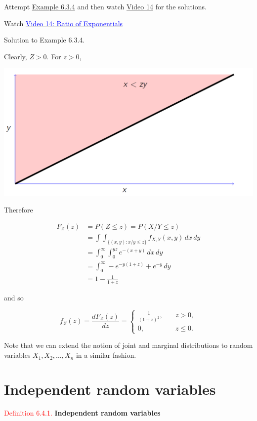 \documentclass[
]{book}
\begin{document}
Attempt \protect\hyperlink{jointdis:exer:joint_Z_Exp}{Example 6.3.4} and then watch \protect\hyperlink{video14}{Video 14} for the solutions.

Watch \href{https://mediaspace.nottingham.ac.uk/media/Ratio+of+Exponentials+FINAL+VERSION/1_iuf9blt3}{\textcolor{blue}{Video 14: Ratio of Exponentials}}

Solution to Example 6.3.4.

Clearly, \(Z>0\). For \(z>0\),

\includegraphics[width=0.7\linewidth]{Images/ratio_exp}

Therefore

\begin{align*}
F_Z(z) &= P( Z \leq z) = P(X/Y \leq z)\\
&= \int\int_{\{(x,y):x/y \leq z\}} f_{X,Y}(x,y) \,dx \,dy \\
&= \int_0^\infty \int_0^{yz} e^{-(x+y)} \,dx\,dy \\
&= \int_0^\infty -e^{-y(1+z)} + e^{-y} \,dy \\
&= 1-\frac{1}{1+z}
\end{align*}

and so

\[ f_Z(z) = \frac{dF_Z(z)}{dz} =\begin{cases} \frac{1}{(1+z)^2}, \quad &z>0, \\
0, \quad  &z \leq 0. \end{cases} \]

\hfill\break

Note that we can extend the notion of joint and marginal distributions to random variables \(X_1,X_2,\dots,X_n\) in a similar fashion.

\hypertarget{jointdis:independent}{%
\section{Independent random variables}\label{jointdis:independent}}

\leavevmode{}%
\textcolor{red}{Definition 6.4.1.}
{\textbf{Independent random variables}}
\end{document}
